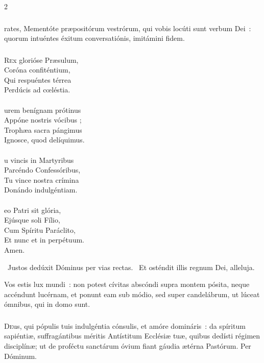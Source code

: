 \documentclass[9pt,twoside]{extarticle}
\begin{document}
\begin{multicols}{2}
{{\subsubsection*{}
rates, Mementóte præpositórum vestrórum, qui vobis locúti sunt verbum Dei~: quorum intuéntes éxitum conversatiónis, imitámini fidem.

\subsubsection*{\center {}}
\lettrine{R}ex glorióse Præsulum,\\
Coróna confiténtium,\\
Qui respuéntes térrea\\
Perdúcis ad cœléstia.\\
\\
urem benígnam prótinus\\
Appóne nostris vócibus ;\\
Trophæa sacra pángimus\\
Ignosce, quod delíquimus.\\
\\
u vincis in Martyribus\\
Parcéndo Confessóribus,\\
Tu vince nostra crímina\\
Donándo indulgéntiam.\\
\\
eo Patri sit glória,\\
Ejúsque soli Fílio,\\
Cum Spíritu Paráclito,\\
Et nunc et in perpétuum.\\
Amen.

\begin{tightlist}{}
\item {}~Justos dedúxit Dóminus per vias rectas. ~Et osténdit illis regnum Dei, alleluja.
\item {} Vos estis lux mundi~: non potest cívitas abscóndi supra montem pósita, neque accéndunt lucérnam, et ponunt eam sub módio, sed super candelábrum, ut lúceat ómnibus, qui in domo sunt.
\end{tightlist}

\subsubsection*{\center {}}
\lettrine{D}eus, qui pópulis tuis indulgéntia cónsulis, et amóre domináris~: da spíritum sapiéntiæ, suffragántibus méritis Antístitum Ecclésiæ tuæ, quibus dedísti régimen disciplínæ; ut de proféctu sanctárum óvium fiant gáudia ætérna Pastórum. Per Dóminum.

}}
\end{multicols}
\end{document}
